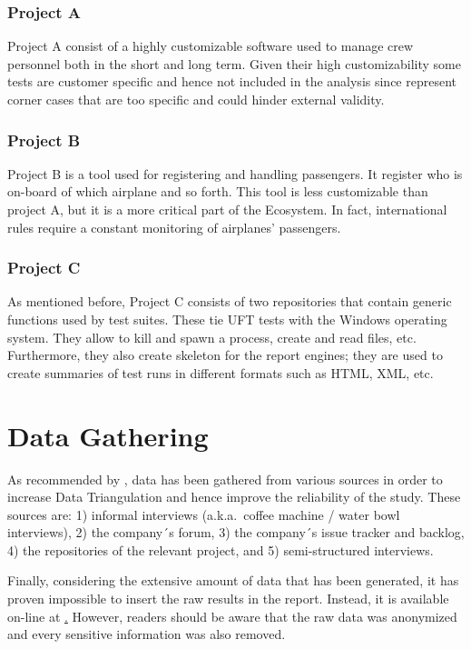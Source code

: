 \subsubsection{Project A}
Project A consist of a highly customizable software used to manage crew personnel both in the short and long term. Given their high customizability some tests are customer specific and hence not included in the analysis since represent corner cases that are too specific and could hinder external validity.

\subsubsection{Project B}
Project B is a tool used for registering and handling passengers. It register who is on-board of which airplane and so forth. This tool is less customizable than project A, but it is a more critical part of the Ecosystem. In fact, international rules require a constant monitoring of airplanes' passengers.

\subsubsection{Project C}
As mentioned before, Project C consists of two repositories that contain generic functions used by test suites. These tie UFT tests with the Windows operating system. They allow to kill and spawn a process, create and read files, etc. Furthermore, they also create skeleton for the report engines; they are used to create summaries of test runs in different formats such as HTML, XML, etc.


%
%
%
%

%
%
%
%
\section{Data Gathering}
As recommended by \cite{case_study_guide,case_study_software_engineering}, data has been gathered from various sources in order to increase Data Triangulation and hence improve the reliability of the study. These sources are: 1) informal interviews (a.k.a.\ coffee machine / water bowl interviews), 2) the company´s forum, 3) the company´s issue tracker and backlog, 4) the repositories of the relevant project, and 5) semi-structured interviews.

Finally, considering the extensive amount of data that has been generated, it has proven impossible to insert the raw results in the report. Instead, it is available on-line at \href{http://???/}. However, readers should be aware that the raw data was anonymized and every sensitive information was also removed. 

